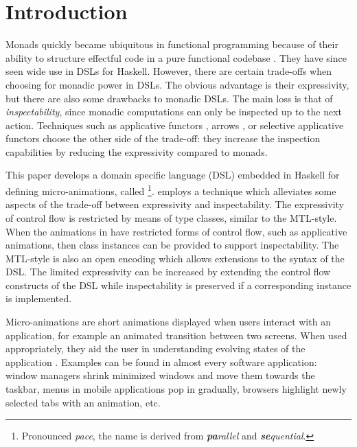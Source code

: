 \section{Introduction}
\label{sec:intro}

Monads quickly became ubiquitous in functional programming because of their ability to structure effectful code in a pure functional codebase \cite{DBLP:conf/lfp/Wadler90}. They have since seen wide use in DSLs for Haskell. However, there are certain trade-offs when choosing for monadic power in DSLs. The obvious advantage is their expressivity, but there are also some drawbacks to monadic DSLs. The main loss is that of \emph{inspectability}, since monadic computations can only be inspected up to the next action. Techniques such as applicative functors \cite{DBLP:journals/jfp/McbrideP08}, arrows \cite{DBLP:journals/scp/Hughes00}, or selective applicative functors \cite{Mokhov:2019:SAF:3352468.3341694} choose the other side of the trade-off: they increase the inspection capabilities by reducing the expressivity compared to monads.

This paper develops a domain specific language (DSL) embedded in Haskell for defining micro-animations, called \dsl{}\footnote{Pronounced \textit{pace}, the name is derived from \textit{\textbf{pa}rallel} and \textit{\textbf{se}quential}.}. \dsl{} employs a technique which alleviates some aspects of the trade-off between expressivity and inspectability. The expressivity of control flow is restricted by means of type classes, similar to the MTL-style. When the animations in \dsl{} have restricted forms of control flow, such as applicative animations, then class instances can be provided to support inspectability. The MTL-style is also an open encoding which allows extensions to the syntax of the DSL. The limited expressivity can be increased by extending the control flow constructs of the DSL while inspectability is preserved if a corresponding instance is implemented.

Micro-animations are short animations displayed when users interact with an application, for example an animated transition between two screens. When used appropriately, they aid the user in understanding evolving states of the application \cite{DBLP:conf/infovis/BedersonB99,DBLP:conf/chi/Gonzalez96,DBLP:journals/tvcg/HeerR07}. Examples can be found in almost every software application: window managers shrink minimized windows and move them towards the taskbar, menus in mobile applications pop in gradually, browsers highlight newly selected tabs with an animation, etc.

